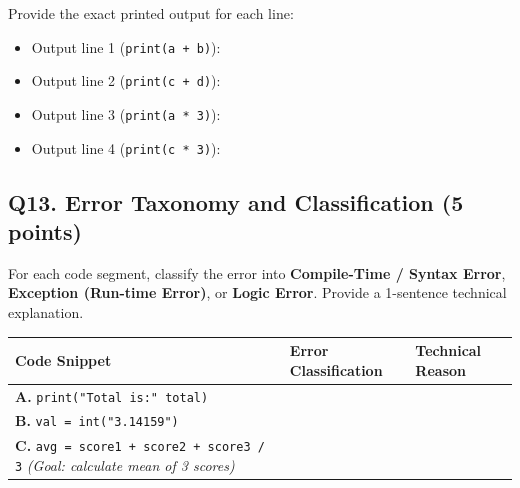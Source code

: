 \documentclass[11pt,a4paper]{article}
\begin{document}
Provide the exact printed output for each line:

\begin{itemize}[noitemsep]

  \item Output line 1 (\texttt{print(a + b)}): \underline{\hspace{4cm}}

  \item Output line 2 (\texttt{print(c + d)}): \underline{\hspace{4cm}}

  \item Output line 3 (\texttt{print(a * 3)}): \underline{\hspace{4cm}}

  \item Output line 4 (\texttt{print(c * 3)}): \underline{\hspace{4cm}}

\end{itemize}

\vspace{0.08cm}

\subsection*{Q13. Error Taxonomy and Classification (5 points)}

For each code segment, classify the error into \textbf{Compile-Time / Syntax Error}, \textbf{Exception (Run-time Error)}, or \textbf{Logic Error}. Provide a 1-sentence technical explanation.

\begin{center}

\renewcommand{\arraystretch}{1.6}

\begin{tabularx}{\textwidth}{|p{5.5cm}|p{4.2cm}|X|}

\hline

\textbf{Code Snippet} & \textbf{Error Classification} & \textbf{Technical Reason} \\

\hline

\textbf{A.} \texttt{print("Total is:" total)} & & \\[0.6cm]

\hline

\textbf{B.} \texttt{val = int("3.14159")} & & \\[0.6cm]

\hline

\textbf{C.} \texttt{avg = score1 + score2 + score3 / 3} \newline \textit{(Goal: calculate mean of 3 scores)} & & \\[0.8cm]

\hline

\end{tabularx}

\end{center}
\end{document}
